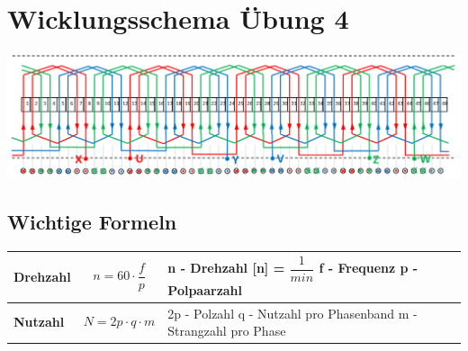 \section{Wicklungsschema Übung 4}
\includegraphics[scale = 0.5]{images/Wicklungsschema}
\subsection{Wichtige Formeln}
    \renewcommand{\arraystretch}{1}
\begin{tabular}{|C{0.3\textwidth}|P{0.3\textwidth}|P{0.3\textwidth}|}
	\hline
	\textbf{Drehzahl} &
    \[n = 60\cdot \dfrac{f}{p}\] &
    \vspace{0.1cm}n - Drehzahl [n] = $\dfrac{1}{min}$ \newline 
    f - Frequenz \newline
    p - Polpaarzahl 
    \\ \hline
	\textbf{Nutzahl} &
    \[ N = 2p\cdot q\cdot m\] &
    2p - Polzahl \newline 
    q - Nutzahl pro Phasenband \newline
    m - Strangzahl pro Phase 
    \\ \hline						 
\end{tabular}

